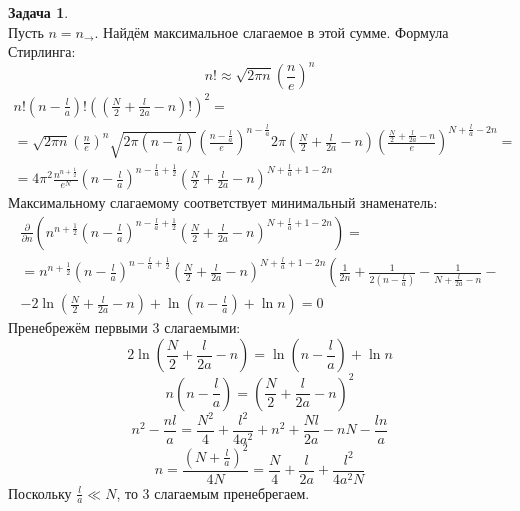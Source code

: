 \documentclass[12pt]{article}
\theoremstyle{definition}
\newtheorem{zad}{Задача}[section]
\begin{document}
\begin{zad}
\begin{equation}
\end{equation}
Пусть $n=n_\rightarrow$. Найдём максимальное слагаемое в этой сумме. Формула Стирлинга:
\begin{equation}
    n!\approx\sqrt{2\pi n}\left(\frac{n}{e}\right)^n
\end{equation}
\begin{multline}
    n!\left(n-\frac{l}{a}\right)!\left(\left(\frac{N}{2}+\frac{l}{2a}-n\right)!\right)^2=\\=\sqrt{2\pi n}\left(\frac{n}{e}\right)^n\sqrt{2\pi\left(n-\frac{l}{a}\right)}\left(\frac{n-\frac{l}{a}}{e}\right)^{n-\frac{l}{a}}2\pi\left(\frac{N}{2}+\frac{l}{2a}-n\right)\left(\frac{\frac{N}{2}+\frac{l}{2a}-n}{e}\right)^{N+\frac{l}{a}-2n}=\\=4\pi^2\frac{n^{n+\frac{1}{2}}}{e^N}\left(n-\frac{l}{a}\right)^{n-\frac{l}{a}+\frac{1}{2}}\left(\frac{N}{2}+\frac{l}{2a}-n\right)^{N+\frac{l}{a}+1-2n}
\end{multline}
Максимальному слагаемому соответствует минимальный знаменатель:
\begin{multline}
    \frac{\partial}{\partial n}\left(n^{n+\frac{1}{2}}\left(n-\frac{l}{a}\right)^{n-\frac{l}{a}+\frac{1}{2}}\left(\frac{N}{2}+\frac{l}{2a}-n\right)^{N+\frac{l}{a}+1-2n}\right)=\\=n^{n+\frac{1}{2}}\left(n-\frac{l}{a}\right)^{n-\frac{l}{a}+\frac{1}{2}}\left(\frac{N}{2}+\frac{l}{2a}-n\right)^{N+\frac{l}{a}+1-2n}\left(\frac{1}{2n}+\frac{1}{2\left(n-\frac{l}{a}\right)}-\frac{1}{N+\frac{l}{2a}-n}-\right.\\\left.-2\ln\left(\frac{N}{2}+\frac{l}{2a}-n\right)+\ln\left(n-\frac{l}{a}\right)+\ln n\right)=0
\end{multline}
Пренебрежём первыми 3 слагаемыми:
\begin{equation}
    2\ln\left(\frac{N}{2}+\frac{l}{2a}-n\right)=\ln\left(n-\frac{l}{a}\right)+\ln n
\end{equation}
\begin{equation}
    n\left(n-\frac{l}{a}\right)=\left(\frac{N}{2}+\frac{l}{2a}-n\right)^2
\end{equation}
\begin{equation}
    n^2-\frac{nl}{a}=\frac{N^2}{4}+\frac{l^2}{4a^2}+n^2+\frac{Nl}{2a}-nN-\frac{ln}{a}
\end{equation}
\begin{equation}
    n=\frac{\left(N+\frac{l}{a}\right)^2}{4N}=\frac{N}{4}+\frac{l}{2a}+\frac{l^2}{4a^2N}
\end{equation}
Поскольку $\frac{l}{a}\ll N$, то 3 слагаемым пренебрегаем.

\end{zad}
\end{document}
